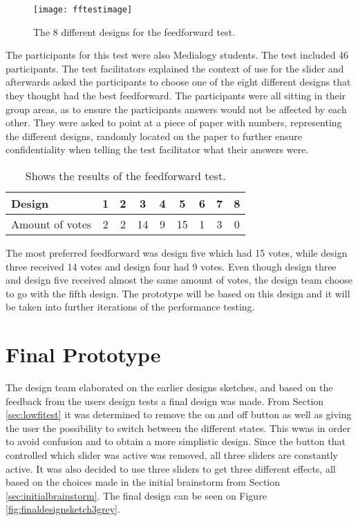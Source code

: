 \begin{figure}[!h] 
\centering
\texttt{[image: fftestimage]}
\caption{\label{fig:fftestimage} The 8 different designs for the feedforward test.}
\end{figure}

The participants for this test were also Medialogy students. The test included 46 participants. The test facilitators explained the context of use for the slider and afterwards asked the participants to choose one of the eight different designs that they thought had the best feedforward. The participants were all sitting in their group areas, as to ensure the participants answers would not be affected by each other. They were asked to point at a piece of paper with numbers, representing the different designs, randomly located on the paper to further ensure confidentiality when telling the test facilitator what their answers were. 

\begin{table}[!h]
\centering
\caption{Shows the results of the feedforward test.\label{tab:sliderresults}}
\begin{tabular}{|l|c|c|c|c|c|c|c|c|}
\hline
Design & 1 & 2 & 3 & 4 & 5 & 6 & 7 & 8 \\ \hline
Amount of votes & 2 & 2 & 14 & 9 & 15 & 1 & 3 & 0 \\ \hline
\end{tabular}
\end{table}

The most preferred feedforward was design five which had 15 votes, while design three received 14 votes and design four had 9 votes.
Even though design three and design five received almost the same amount of votes, the design team choose to go with the fifth design. The prototype will be based on this design and it will be taken into further iterations of the performance testing. 



\section{Final Prototype}\label{sec:finaldesign final}
The design team elaborated on the earlier designs sketches, and based on the feedback from the users design tests a final design was made. From Section \ref{sec:lowfitest} it was determined to remove the on and off button as well as giving the user the possibility to switch between the different states. This wwas in order to avoid confusion and to obtain a more simplistic design. Since the button that controlled which slider was active was removed, all three sliders are constantly active. It was also decided to use three sliders to get three different effects, all based on the choices made in the initial brainstorm from Section \ref{sec:initialbrainstorm}. The final design can be seen on Figure \ref{fig:finaldesignsketch3grey}.

